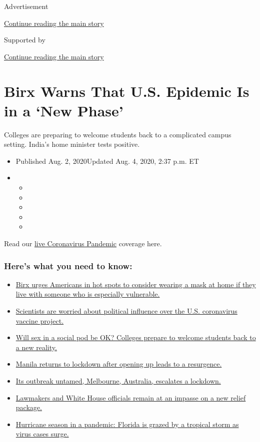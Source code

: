Advertisement

\protect\hyperlink{after-top}{Continue reading the main story}

Supported by

\protect\hyperlink{after-sponsor}{Continue reading the main story}

\hypertarget{birx-warns-that-us-epidemic-is-in-a-new-phase}{%
\section{Birx Warns That U.S. Epidemic Is in a `New
Phase'}\label{birx-warns-that-us-epidemic-is-in-a-new-phase}}

Colleges are preparing to welcome students back to a complicated campus
setting. India's home minister tests positive.

\begin{itemize}
\item
  Published Aug. 2, 2020Updated Aug. 4, 2020, 2:37 p.m. ET
\item
  \begin{itemize}
  \item
  \item
  \item
  \item
  \item
  \end{itemize}
\end{itemize}

Read our
\href{https://www.nytimes.com/2020/08/04/world/coronavirus-cases.html}{live
Coronavirus Pandemic} coverage here.

\hypertarget{heres-what-you-need-to-know}{%
\subsubsection{Here's what you need to
know:}\label{heres-what-you-need-to-know}}

\begin{itemize}
\tightlist
\item
  \protect\hyperlink{link-4c637647}{Birx urges Americans in hot spots to
  consider wearing a mask at home if they live with someone who is
  especially vulnerable.}
\item
  \protect\hyperlink{link-18bff79b}{Scientists are worried about
  political influence over the U.S. coronavirus vaccine project.}
\item
  \protect\hyperlink{link-79292e3}{Will sex in a social pod be OK?
  Colleges prepare to welcome students back to a new reality.}
\item
  \protect\hyperlink{link-41ce99eb}{Manila returns to lockdown after
  opening up leads to a resurgence.}
\item
  \protect\hyperlink{link-74f9a2b2}{Its outbreak untamed, Melbourne,
  Australia, escalates a lockdown.}
\item
  \protect\hyperlink{link-1a62dbb2}{Lawmakers and White House officials
  remain at an impasse on a new relief package.}
\item
  \protect\hyperlink{link-479653b6}{Hurricane season in a pandemic:
  Florida is grazed by a tropical storm as virus cases surge.}
\end{itemize}

